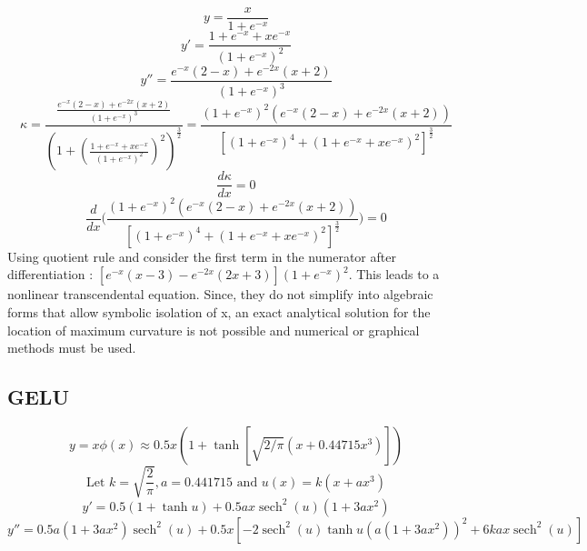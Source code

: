 \documentclass{article}
\begin{document}
\begin{displaymath}
y = \frac{x}{1 + e^{-x}}
\end{displaymath}
\begin{displaymath}
y' = \frac{1 + e^{-x} + xe^{-x}}{(1 + e^{-x})^2}
\end{displaymath}
\begin{displaymath}
y'' = \frac{e^{-x}(2 - x) + e^{-2x}(x+2)}{(1 + e^{-x})^3}
\end{displaymath}
\begin{displaymath}
\kappa = \frac{\frac{e^{-x}(2 - x) + e^{-2x}(x+2)}{(1 + e^{-x})^3}}{(1 + (\frac{1 + e^{-x} + xe^{-x}}{(1 + e^{-x})^2})^2)^\frac{3}{2}}
= \frac{(1 + e^{-x})^2(e^{-x}(2 - x) + e^{-2x}(x+2))}{[(1 + e^{-x})^4 + (1 + e^{-x} + xe^{-x})^2]^\frac{3}{2}}
\end{displaymath}
\begin{displaymath}
\frac{d \kappa}{dx} = 0
\end{displaymath}
\begin{displaymath}
\frac{d}{dx}\biggr(\frac{(1 + e^{-x})^2(e^{-x}(2 - x) + e^{-2x}(x+2))}{[(1 + e^{-x})^4 + (1 + e^{-x} + xe^{-x})^2]^\frac{3}{2}}\biggr) = 0
\end{displaymath}
Using quotient rule and consider the first term in the numerator after differentiation :
$[e^{-x}(x-3)-e^{-2x}(2x+3)](1+e^{-x})^2$. This leads to a nonlinear 
transcendental equation. Since, they do not simplify into algebraic 
forms that allow symbolic isolation of x, an exact analytical solution for the location of 
maximum curvature is not possible and numerical or graphical methods must be used.

\subsection{GELU}\label{app:gelu}

\begin{displaymath}
y = x \phi(x) \approx 0.5x(1 + \tanh [\sqrt{2 / \pi}(x + 0.44715 x^3)])
\end{displaymath}
\begin{displaymath}
\text{Let }k = \sqrt{\frac{2}{\pi}}, a = 0.441715 \text{ and }u(x) = k(x + ax^3)
\end{displaymath}
\begin{displaymath}
y' = 0.5(1 + \tanh{u}) + 0.5ax\operatorname{sech}^2(u)(1 + 3ax^2)
\end{displaymath}
\begin{displaymath}
y'' = 0.5a(1 + 3ax^2)\operatorname{sech}^2(u) + 0.5x[-2\operatorname{sech}^2(u)\tanh{u}(a(1 + 3ax^2))^2 + 6kax\operatorname{sech}^2(u)]
\end{displaymath}
\end{document}
